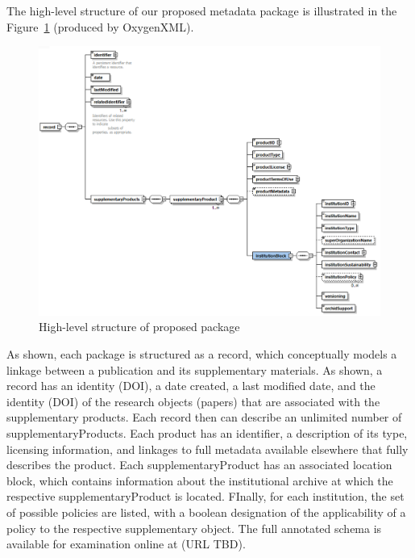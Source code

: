 The high-level structure of our proposed metadata package is illustrated in the Figure~\ref{fig:schema_v1} (produced by OxygenXML). 
\begin{figure}
	\includegraphics[width=\textwidth]{images/schema_v1}
	\caption{\label{fig:schema_v1}High-level structure of proposed package}
\end{figure} 
As shown, each package is structured as a record, which conceptually models a linkage between a publication and its supplementary materials.  As shown, a record has an identity (DOI), a date created, a last modified date, and the identity (DOI) of the research objects (papers) that are associated with the supplementary products.
Each record then can describe an unlimited number of supplementaryProducts.  Each product has an identifier, a description of its type, licensing information, and linkages to full metadata available elsewhere that fully describes the product.  Each supplementaryProduct has an associated location block, which contains information about the institutional archive at which the respective supplementaryProduct is located.  FInally, for each institution, the set of possible policies are listed, with a boolean designation of the applicability of a policy to the respective supplementary object.   
The full annotated schema is available for examination online at (URL TBD).